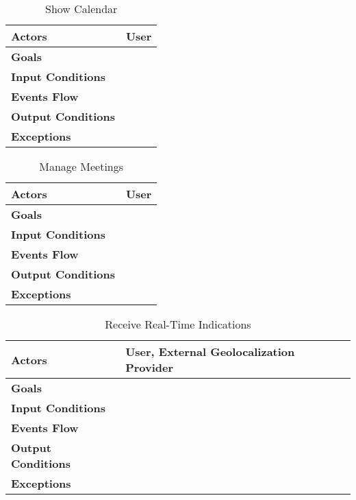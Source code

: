 \begin{table}[H]
	\centering
	\def\arraystretch{1.5}
	\begin{tabular}{|p{7cm}|p{7cm}|}
		\hline
		\textbf{Actors}            & User		    \\ \hline
		\textbf{Goals}             &            \\ \hline
		\textbf{Input Conditions}  &            \\ \hline
		\textbf{Events Flow}       &            \\ \hline
		\textbf{Output Conditions} &            \\ \hline
		\textbf{Exceptions}        &            \\ \hline
	\end{tabular}
	\caption{Show Calendar}
\end{table}

\begin{table}[H]
	\centering
	\def\arraystretch{1.5}
	\begin{tabular}{|p{7cm}|p{7cm}|}
		\hline
		\textbf{Actors}            & User		    \\ \hline
		\textbf{Goals}             &            \\ \hline
		\textbf{Input Conditions}  &            \\ \hline
		\textbf{Events Flow}       &            \\ \hline
		\textbf{Output Conditions} &            \\ \hline
		\textbf{Exceptions}        &            \\ \hline
	\end{tabular}
	\caption{Manage Meetings}
\end{table}

\begin{table}[H]
	\centering
	\def\arraystretch{1.5}
	\begin{tabular}{|p{7cm}|p{7cm}|}
		\hline
		\textbf{Actors}            & User, External Geolocalization Provider		    \\ \hline
		\textbf{Goals}             &            \\ \hline
		\textbf{Input Conditions}  &            \\ \hline
		\textbf{Events Flow}       &            \\ \hline
		\textbf{Output Conditions} &            \\ \hline
		\textbf{Exceptions}        &            \\ \hline
	\end{tabular}
	\caption{Receive Real-Time Indications}
\end{table}

